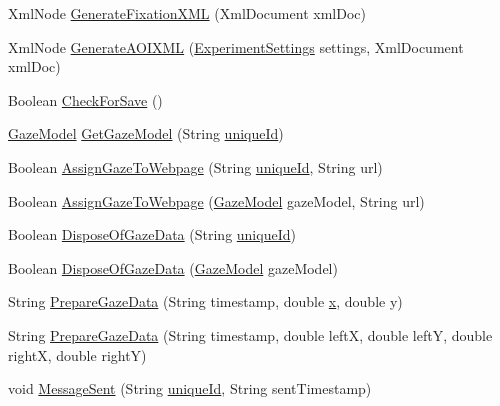 \begin{DoxyCompactItemize}
\item 
Xml\+Node \hyperlink{class_web_analyzer_1_1_models_1_1_data_model_1_1_test_model_ab0d963dc5a7c320e3133e88585acfadc}{Generate\+Fixation\+X\+M\+L} (Xml\+Document xml\+Doc)
\item 
Xml\+Node \hyperlink{class_web_analyzer_1_1_models_1_1_data_model_1_1_test_model_a1822a101fa0793bd807575d7fcdbd65d}{Generate\+A\+O\+I\+X\+M\+L} (\hyperlink{class_web_analyzer_1_1_models_1_1_settings_model_1_1_experiment_settings}{Experiment\+Settings} settings, Xml\+Document xml\+Doc)
\item 
Boolean \hyperlink{class_web_analyzer_1_1_models_1_1_data_model_1_1_test_model_abc6d6772659bfd91a6d1fe6923ca7a2b}{Check\+For\+Save} ()
\item 
\hyperlink{class_web_analyzer_1_1_models_1_1_data_model_1_1_gaze_model}{Gaze\+Model} \hyperlink{class_web_analyzer_1_1_models_1_1_data_model_1_1_test_model_a276585c6c2bdca3cf99058e2287636dc}{Get\+Gaze\+Model} (String \hyperlink{_u_i_2_h_t_m_l_resources_2js_2lib_2underscore_8min_8js_af690ff5521d79c7128861033ae80ae17}{unique\+Id})
\item 
Boolean \hyperlink{class_web_analyzer_1_1_models_1_1_data_model_1_1_test_model_a5c8db4f36460523cfefc5726bfd31177}{Assign\+Gaze\+To\+Webpage} (String \hyperlink{_u_i_2_h_t_m_l_resources_2js_2lib_2underscore_8min_8js_af690ff5521d79c7128861033ae80ae17}{unique\+Id}, String url)
\item 
Boolean \hyperlink{class_web_analyzer_1_1_models_1_1_data_model_1_1_test_model_aa2f20e0defbef5daf8b4cbe282fc6a25}{Assign\+Gaze\+To\+Webpage} (\hyperlink{class_web_analyzer_1_1_models_1_1_data_model_1_1_gaze_model}{Gaze\+Model} gaze\+Model, String url)
\item 
Boolean \hyperlink{class_web_analyzer_1_1_models_1_1_data_model_1_1_test_model_a4e84c40eeb26adae1fcacc4ffc291d2f}{Dispose\+Of\+Gaze\+Data} (String \hyperlink{_u_i_2_h_t_m_l_resources_2js_2lib_2underscore_8min_8js_af690ff5521d79c7128861033ae80ae17}{unique\+Id})
\item 
Boolean \hyperlink{class_web_analyzer_1_1_models_1_1_data_model_1_1_test_model_a5f84a8ffb744cbe5dc345e1f34bff9a6}{Dispose\+Of\+Gaze\+Data} (\hyperlink{class_web_analyzer_1_1_models_1_1_data_model_1_1_gaze_model}{Gaze\+Model} gaze\+Model)
\item 
String \hyperlink{class_web_analyzer_1_1_models_1_1_data_model_1_1_test_model_a21b653298654ea728c144a01e1dc79d0}{Prepare\+Gaze\+Data} (String timestamp, double \hyperlink{_u_i_2_h_t_m_l_resources_2js_2lib_2underscore_8min_8js_a81e910173af87b1161e719a504d52407}{x}, double y)
\item 
String \hyperlink{class_web_analyzer_1_1_models_1_1_data_model_1_1_test_model_a9a5e8a32d33cfbd93c7a42260d14e931}{Prepare\+Gaze\+Data} (String timestamp, double left\+X, double left\+Y, double right\+X, double right\+Y)
\item 
void \hyperlink{class_web_analyzer_1_1_models_1_1_data_model_1_1_test_model_af5443d18d5c7d80edaf417ee28bb296e}{Message\+Sent} (String \hyperlink{_u_i_2_h_t_m_l_resources_2js_2lib_2underscore_8min_8js_af690ff5521d79c7128861033ae80ae17}{unique\+Id}, String sent\+Timestamp)
\end{DoxyCompactItemize}

